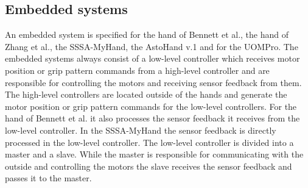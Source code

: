 \documentclass[a4paper, 10pt, conference]{ieeeconf}      %
\begin{document}
\subsection{Embedded systems}

An embedded system is specified for the hand of Bennett et al., the hand of Zhang et al., the SSSA-MyHand, the AstoHand v.1 and for the UOMPro. The embedded systems always consist of a low-level controller which receives motor position or grip pattern commands from a high-level controller and are responsible for controlling the motors and receiving sensor feedback from them. The high-level controllers are located outside of the hands and generate the motor position or grip pattern commands for the low-level controllers. For the hand of Bennett et al. it also processes the sensor feedback it receives from the low-level controller. In the SSSA-MyHand the sensor feedback is directly processed in the low-level controller. The low-level controller is divided into a master and a slave. While the master is responsible for communicating with the outside and controlling the motors the slave receives the sensor feedback and passes it to the master.

\newpage



%
\end{document}
